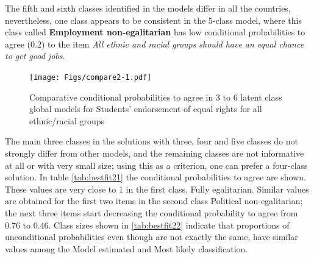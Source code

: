 \documentclass[12pt,a4paper,oneside]{reedthesis}
\begin{document}
The fifth and sixth classes identified in the models differ in all the countries, nevertheless, one class appears to be consistent in the 5-class model, where this class called \textbf{Employment non-egalitarian} has low conditional probabilities to agree (0.2) to the item \emph{All ethnic and racial groups should have an equal chance to get good jobs}.
\begin{figure}
\centering
\texttt{[image: Figs/compare2-1.pdf]}
\caption{\label{fig:compare2}Comparative conditional probabilities to agree in 3 to 6 latent class global models for Students' endorsement of equal rights for all ethnic/racial groups}
\end{figure}
The main three classes in the solutions with three, four and five classes do not strongly differ from other models, and the remaining classes are not informative at all or with very small size; using this as a criterion, one can prefer a four-class solution. In table \ref{tab:bestfit21} the conditional probabilities to agree are shown. These values are very close to 1 in the first class, Fully egalitarian. Similar values are obtained for the first two items in the second class Political non-egalitarian; the next three items start decreasing the conditional probability to agree from 0.76 to 0.46. Class sizes shown in \ref{tab:bestfit22} indicate that proportions of unconditional probabilities even though are not exactly the same, have similar values among the Model estimated and Most likely classification.
\end{document}
